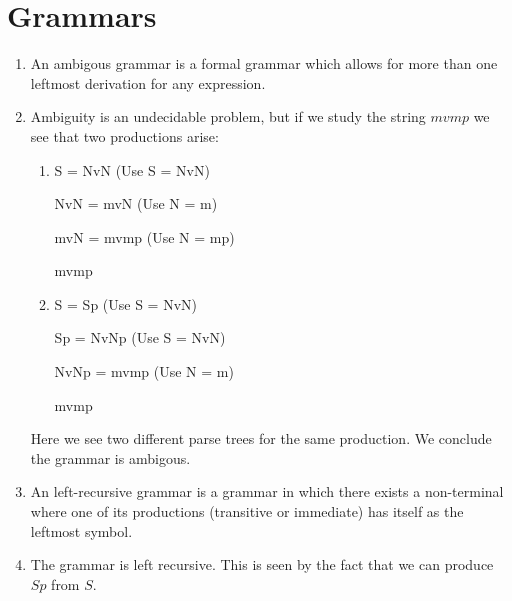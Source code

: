 \documentclass[a4paper]{article}
\begin{document}
\newpage

\section{Grammars}

\begin{enumerate}[label=\alph*)]

\item
    An ambigous grammar is a formal grammar which allows for more than one leftmost derivation for any expression.

\item
    Ambiguity is an undecidable problem, but if we study the string $ mvmp $ we see that two productions arise:

\begin{enumerate}[label=\roman*]
\item
    S = NvN  (Use S = NvN)

    NvN = mvN (Use N = m)

    mvN = mvmp (Use N = mp)

    mvmp

\item
    S = Sp (Use S = NvN)

    Sp = NvNp (Use S = NvN)

    NvNp = mvmp (Use N = m)

    mvmp

\end{enumerate}
Here we see two different parse trees for the same production. We conclude the grammar is ambigous.

\item
An left-recursive grammar is a grammar in which there exists a non-terminal where one of its productions (transitive or immediate) has itself as the leftmost symbol.

\item
The grammar is left recursive. This is seen by the fact that we can produce $ Sp $ from $ S $.
    
    

\end{enumerate}
\end{document}
